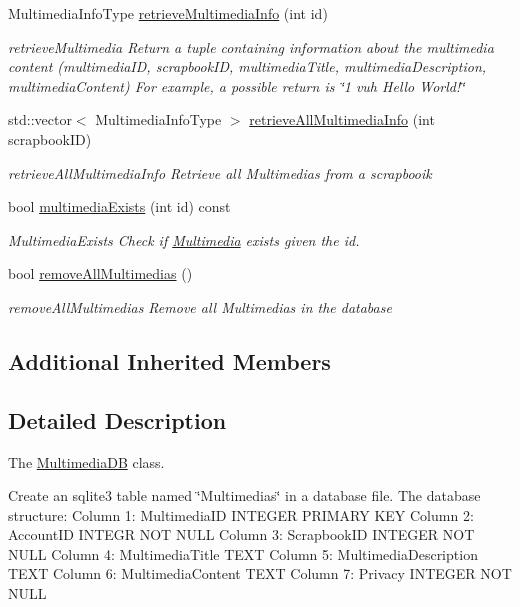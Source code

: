 \begin{DoxyCompactItemize}
Multimedia\+Info\+Type \hyperlink{classMultimediaDB_adffc035101015974eba99b3f9fc91323}{retrieve\+Multimedia\+Info} (int id)
\begin{DoxyCompactList}\small\item\em retrieve\+Multimedia Return a tuple containing information about the multimedia content (multimedia\+ID, scrapbook\+ID, multimedia\+Title, multimedia\+Description, multimedia\+Content) For example, a possible return is \char`\"{}1 vuh Hello World!\char`\"{} \end{DoxyCompactList}\item 
std\+::vector$<$ Multimedia\+Info\+Type $>$ \hyperlink{classMultimediaDB_adc8794e2f6bc8c0c6927d8d2c3b54c59}{retrieve\+All\+Multimedia\+Info} (int scrapbook\+ID)
\begin{DoxyCompactList}\small\item\em retrieve\+All\+Multimedia\+Info Retrieve all Multimedias from a scrapbooik \end{DoxyCompactList}\item 
bool \hyperlink{classMultimediaDB_a65b3231aabb21072233556e6913ed960}{multimedia\+Exists} (int id) const 
\begin{DoxyCompactList}\small\item\em Multimedia\+Exists Check if \hyperlink{classMultimedia}{Multimedia} exists given the id. \end{DoxyCompactList}\item 
bool \hyperlink{classMultimediaDB_a8582ed163b9abdb708d7232b44583800}{remove\+All\+Multimedias} ()
\begin{DoxyCompactList}\small\item\em remove\+All\+Multimedias Remove all Multimedias in the database \end{DoxyCompactList}\end{DoxyCompactItemize}
\subsection*{Additional Inherited Members}


\subsection{Detailed Description}
The \hyperlink{classMultimediaDB}{Multimedia\+DB} class. 

Create an sqlite3 table named \char`\"{}\+Multimedias\char`\"{} in a database file. The database structure\+: Column 1\+: Multimedia\+ID I\+N\+T\+E\+G\+ER P\+R\+I\+M\+A\+RY K\+EY Column 2\+: Account\+ID I\+N\+T\+E\+GR N\+OT N\+U\+LL Column 3\+: Scrapbook\+ID I\+N\+T\+E\+G\+ER N\+OT N\+U\+LL Column 4\+: Multimedia\+Title T\+E\+XT Column 5\+: Multimedia\+Description T\+E\+XT Column 6\+: Multimedia\+Content T\+E\+XT Column 7\+: Privacy I\+N\+T\+E\+G\+ER N\+OT N\+U\+LL 

